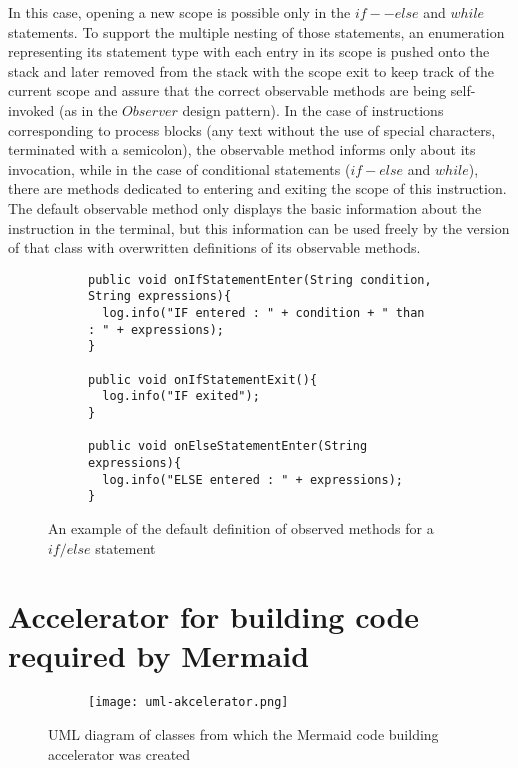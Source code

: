 In this case, opening a new scope is possible only in the $if -- else$ and $while$ statements. To support the multiple nesting of those statements, an enumeration representing its statement type with each entry in its scope is pushed onto the stack and later removed from the stack with the scope exit to keep track of the current scope and assure that the correct observable methods are being self-invoked (as in the $Observer$ design pattern). In the case of instructions corresponding to process blocks (any text without the use of special characters, terminated with a semicolon), the observable method informs only about its invocation, while in the case of conditional statements ($if-else$ and $while$), there are methods dedicated to entering and exiting the scope of this instruction. The default observable method only displays the basic information about the instruction in the terminal, but this information can be used freely by the version of that class with overwritten definitions of its observable methods. 
						
\begin{figure}[H]
  \begin{subfigure}{\textwidth}
		\begin{verbatim}
public void onIfStatementEnter(String condition, String expressions){
  log.info("IF entered : " + condition + " than : " + expressions);
}

public void onIfStatementExit(){
  log.info("IF exited");
}

public void onElseStatementEnter(String expressions){
  log.info("ELSE entered : " + expressions);
}
		\end{verbatim}
  \end{subfigure}\hfill
  \caption{An example of the default definition of observed methods for a $if/else$ statement}
\end{figure}



\section{Accelerator for building code required by Mermaid}

\begin{figure}[H]
  \begin{subfigure}{\textwidth}
  	\centering
    \texttt{[image: uml-akcelerator.png]}
  \end{subfigure}\hfill
  \caption{UML diagram of classes from which the Mermaid code building accelerator was created}
\end{figure}

